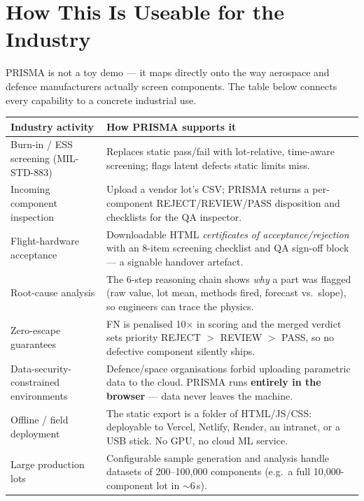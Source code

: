 \documentclass[11pt,a4paper]{article}
\newcommand{\answerbox}[2]{\par\vspace{0.8em}\noindent
  \begin{tcolorbox}[colback=isroblue!6,colframe=isroblue,
    title={\sffamily\bfseries\color{white}#1},arc=2pt,boxrule=1.2pt]
    #2
  \end{tcolorbox}\par\vspace{0.4em}}
\begin{document}
\section{How This Is Useable for the Industry}

\answerbox{Where does PRISMA fit in the real industrial world?}{
  PRISMA is not a toy demo --- it maps directly onto the way aerospace and defence manufacturers
  actually screen components. The table below connects every capability to a concrete industrial use.
}

\begin{center}
\begin{longtable}{@{}p{5cm}p{9.6cm}@{}}
\toprule
\textbf{Industry activity} & \textbf{How PRISMA supports it}\\
\midrule
\endhead
Burn-in / ESS screening (MIL-STD-883) & Replaces static pass/fail with lot-relative, time-aware
  screening; flags latent defects static limits miss.\\
\addlinespace
Incoming component inspection & Upload a vendor lot's CSV; PRISMA returns a per-component
  REJECT/REVIEW/PASS disposition and checklists for the QA inspector.\\
\addlinespace
Flight-hardware acceptance & Downloadable HTML \emph{certificates of acceptance/rejection} with an
  8-item screening checklist and QA sign-off block --- a signable handover artefact.\\
\addlinespace
Root-cause analysis & The 6-step reasoning chain shows \emph{why} a part was flagged (raw value,
  lot mean, methods fired, forecast vs.\ slope), so engineers can trace the physics.\\
\addlinespace
Zero-escape guarantees & FN is penalised 10$\times$ in scoring and the merged verdict sets priority
  REJECT $>$ REVIEW $>$ PASS, so no defective component silently ships.\\
\addlinespace
Data-security-constrained environments & Defence/space organisations forbid uploading parametric
  data to the cloud. PRISMA runs \textbf{entirely in the browser} --- data never leaves the machine.\\
\addlinespace
Offline / field deployment & The static export is a folder of HTML/JS/CSS: deployable to Vercel,
  Netlify, Render, an intranet, or a USB stick. No GPU, no cloud ML service.\\
\addlinespace
Large production lots & Configurable sample generation and analysis handle datasets of
  200--100{,}000 components (e.g.\ a full 10{,}000-component lot in $\sim$6\,s).\\
\bottomrule
\end{longtable}
\end{center}
\end{document}
